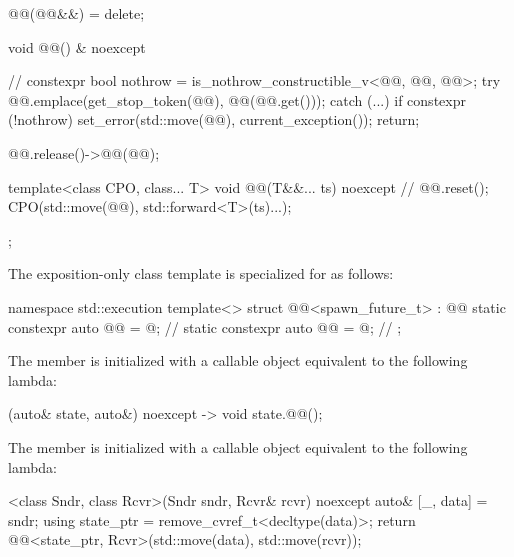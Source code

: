 \begin{codeblock}
{{    @@(@@&&) = delete;

    void @@() & noexcept {                                     // \expos
      constexpr bool nothrow =
        is_nothrow_constructible_v<@@, @@, @@>;
      try {
        @@.emplace(get_stop_token(@@), @@(@@.get()));
      }
      catch (...) {
        if constexpr (!nothrow) {
          set_error(std::move(@@), current_exception());
          return;
        }
      }

      @@.release()->@@(@@);
    }

    template<class CPO, class... T>
    void @@(T&&... ts) noexcept {                     // \expos
      @@.reset();
      CPO{}(std::move(@@), std::forward<T>(ts)...);
    }
  };
}
\end{codeblock}

\pnum
The exposition-only class template 
is specialized for  as follows:

%
\begin{codeblock}
namespace std::execution {
  template<>
  struct @@<spawn_future_t> : @@ {
    static constexpr auto @@ = @\seebelow@;                    // \expos
    static constexpr auto @@ = @\seebelow@;                // \expos
  };
}
\end{codeblock}

\pnum
The member 
is initialized with a callable object equivalent to the following lambda:
\begin{codeblock}
[](auto& state, auto&) noexcept -> void {
  state.@@();
}
\end{codeblock}

\pnum
The member 
is initialized with a callable object equivalent to the following lambda:
\begin{codeblock}
[]<class Sndr, class Rcvr>(Sndr sndr, Rcvr& rcvr) noexcept {
  auto& [_, data] = sndr;
  using state_ptr = remove_cvref_t<decltype(data)>;
  return @@<state_ptr, Rcvr>(std::move(data), std::move(rcvr));
}
\end{codeblock}

